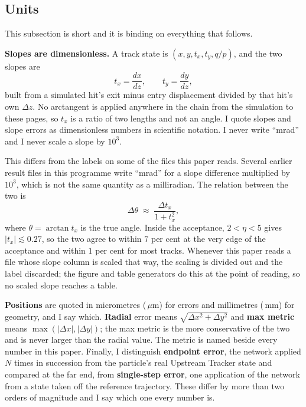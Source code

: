 \documentclass[11pt,a4paper]{article}
\newcommand{\um}{\ensuremath{\,\mu\mathrm{m}}}
\newcommand{\mm}{\ensuremath{\,\mathrm{mm}}}
\begin{document}
\subsection{Units}
\label{sec:data-units}

This subsection is short and it is binding on everything that follows.

\textbf{Slopes are dimensionless.} A track state is
$(x, y, t_x, t_y, q/p)$, and the two slopes are
\begin{equation}
  t_x = \frac{dx}{dz}, \qquad t_y = \frac{dy}{dz},
\end{equation}
built from a simulated hit's exit minus entry displacement divided by that
hit's own $\Delta z$. No arctangent is applied anywhere in the chain from the
simulation to these pages, so $t_x$ is a ratio of two lengths and not an angle.
I quote slopes and slope errors as dimensionless numbers in scientific
notation. I never write ``mrad'' and I never scale a slope by $10^{3}$.

This differs from the labels on some of the files this paper reads. Several
earlier result files in this programme write ``mrad'' for a slope difference
multiplied by $10^{3}$, which is not the same quantity as a milliradian. The
relation between the two is
\begin{equation}
  \Delta\theta \;\approx\; \frac{\Delta t_x}{1 + t_x^{2}},
\end{equation}
where $\theta = \arctan t_x$ is the true angle. Inside the acceptance,
$2 < \eta < 5$ gives $|t_x| \lesssim 0.27$, so the two agree to within $7$ per
cent at the very edge of the acceptance and within $1$ per cent for most tracks.
Whenever this paper reads a file whose slope column is scaled that way, the
scaling is divided out and the label discarded; the figure and table generators
do this at the point of reading, so no scaled slope reaches a table.

\textbf{Positions} are quoted in micrometres (\um) for errors and millimetres
(\mm) for geometry, and I say which. \textbf{Radial} error means
$\sqrt{\Delta x^{2} + \Delta y^{2}}$ and \textbf{max metric} means
$\max(|\Delta x|, |\Delta y|)$; the max metric is the more conservative of the
two and is never larger than the radial value. The metric is named beside every
number in this paper. Finally, I distinguish \textbf{endpoint error}, the
network applied $N$ times in succession from the particle's real Upstream
Tracker state and compared at the far end, from \textbf{single-step error}, one
application of the network from a state taken off the reference trajectory.
These differ by more than two orders of magnitude and I say which one every
number is.
\end{document}
